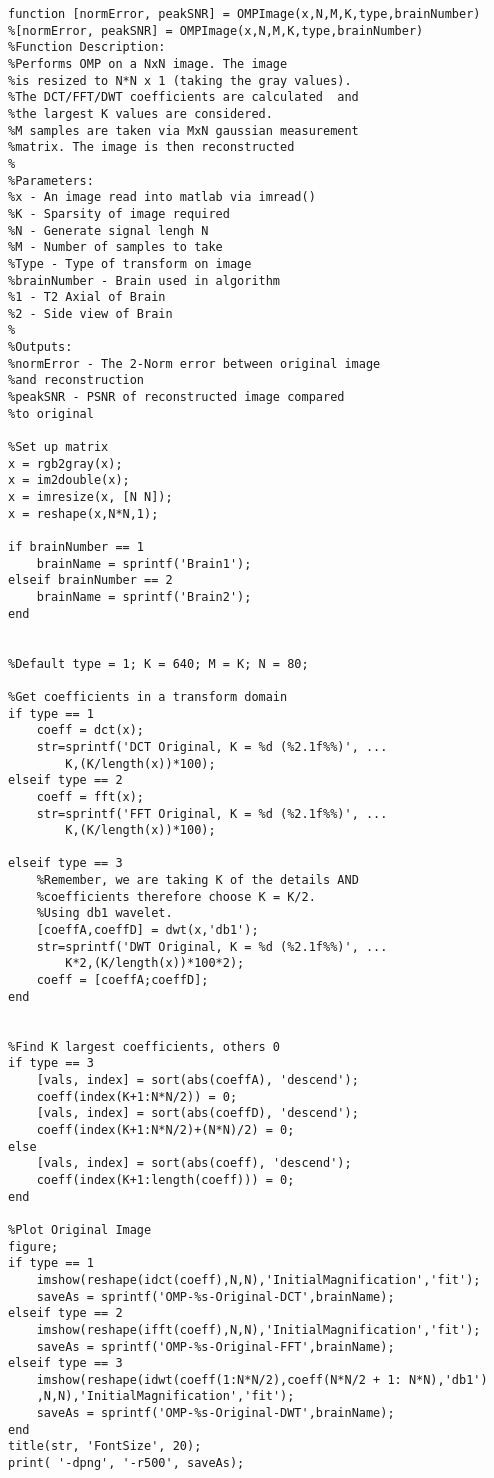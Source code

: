 \documentclass[titlepage,oneside, 12pt]{book}
\theoremstyle{break}
\begin{document}
\begin{appendices}
\begin{lstlisting}
function [normError, peakSNR] = OMPImage(x,N,M,K,type,brainNumber)
%[normError, peakSNR] = OMPImage(x,N,M,K,type,brainNumber)
%Function Description: 
%Performs OMP on a NxN image. The image
%is resized to N*N x 1 (taking the gray values).
%The DCT/FFT/DWT coefficients are calculated  and 
%the largest K values are considered. 
%M samples are taken via MxN gaussian measurement 
%matrix. The image is then reconstructed
%
%Parameters:
%x - An image read into matlab via imread()
%K - Sparsity of image required
%N - Generate signal lengh N
%M - Number of samples to take
%Type - Type of transform on image
%brainNumber - Brain used in algorithm
%1 - T2 Axial of Brain
%2 - Side view of Brain
%
%Outputs:
%normError - The 2-Norm error between original image
%and reconstruction
%peakSNR - PSNR of reconstructed image compared 
%to original

%Set up matrix
x = rgb2gray(x);
x = im2double(x);
x = imresize(x, [N N]);
x = reshape(x,N*N,1);

if brainNumber == 1
    brainName = sprintf('Brain1');
elseif brainNumber == 2
    brainName = sprintf('Brain2');
end


%Default type = 1; K = 640; M = K; N = 80;

%Get coefficients in a transform domain
if type == 1
    coeff = dct(x);
    str=sprintf('DCT Original, K = %d (%2.1f%%)', ...
        K,(K/length(x))*100);
elseif type == 2
    coeff = fft(x);
    str=sprintf('FFT Original, K = %d (%2.1f%%)', ...
        K,(K/length(x))*100);
    
elseif type == 3
    %Remember, we are taking K of the details AND 
    %coefficients therefore choose K = K/2. 
    %Using db1 wavelet.
    [coeffA,coeffD] = dwt(x,'db1');
    str=sprintf('DWT Original, K = %d (%2.1f%%)', ...
        K*2,(K/length(x))*100*2);
    coeff = [coeffA;coeffD];    
end
    

%Find K largest coefficients, others 0
if type == 3
    [vals, index] = sort(abs(coeffA), 'descend');
    coeff(index(K+1:N*N/2)) = 0;
    [vals, index] = sort(abs(coeffD), 'descend');
    coeff(index(K+1:N*N/2)+(N*N)/2) = 0;
else
    [vals, index] = sort(abs(coeff), 'descend');
    coeff(index(K+1:length(coeff))) = 0;
end

%Plot Original Image
figure;
if type == 1
    imshow(reshape(idct(coeff),N,N),'InitialMagnification','fit');
    saveAs = sprintf('OMP-%s-Original-DCT',brainName);
elseif type == 2
    imshow(reshape(ifft(coeff),N,N),'InitialMagnification','fit');
    saveAs = sprintf('OMP-%s-Original-FFT',brainName);
elseif type == 3
    imshow(reshape(idwt(coeff(1:N*N/2),coeff(N*N/2 + 1: N*N),'db1')
    ,N,N),'InitialMagnification','fit'); 
    saveAs = sprintf('OMP-%s-Original-DWT',brainName);
end
title(str, 'FontSize', 20); 
print( '-dpng', '-r500', saveAs);




\end{lstlisting}
\end{appendices}
\end{document}
